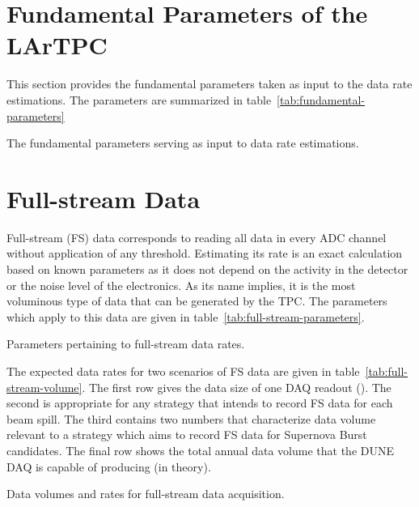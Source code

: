 \section{Fundamental Parameters of the LArTPC}

This section provides the fundamental parameters taken as input to the
data rate estimations.
The parameters are summarized in
table~\ref{tab:fundamental-parameters}

\begin{table}[htbp]
  \centering
  \caption{The fundamental parameters serving as input to data rate estimations.}
  
  \label{tab:fundamental-parameters}
\end{table}


\section{Full-stream Data}

Full-stream (FS) data corresponds to reading all data in every ADC channel without application of any threshold.
Estimating its rate is an exact calculation based on known parameters as it does not depend on
the activity in the detector or the noise level of the electronics.
As its name implies, it is the most voluminous type of data that can be generated by the TPC.
The parameters which apply to this data are given in table~\ref{tab:full-stream-parameters}.

\begin{table}[htbp]
  \centering
  \caption{Parameters pertaining to full-stream data rates.}
  
  \label{tab:full-stream-parameters}
\end{table}

The expected data rates for two scenarios of FS data are given
in table~\ref{tab:full-stream-volume}.
The first row gives the data size of one DAQ readout (\daqreadouttime).
The second is appropriate for any strategy that intends to record FS
data for each beam spill.
The third contains two numbers that characterize data volume relevant to a strategy which aims to record FS data
for Supernova Burst candidates.
The final row  shows the total annual data volume that the DUNE DAQ is capable of producing (in theory).


\begin{table}[htbp]
  \centering
  \caption{Data volumes and rates for full-stream data
    acquisition.}
  
  \label{tab:full-stream-volume}
\end{table}

